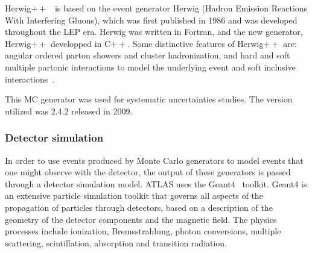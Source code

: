 {\sc Herwig}$++$~\cite{HerwigPP} is based on the event generator {\sc Herwig} (Hadron Emission Reactions With Interfering Gluons), which was first published in 1986 and was developed throughout the LEP era.  {\sc Herwig} was written in Fortran, and the new generator, Herwig$++$ developped in C$++$. 
Some distinctive features of Herwig$++$ are: angular ordered parton showers and cluster hadronization, and 
hard and soft multiple partonic interactions to model the underlying event and soft inclusive interactions~\cite{1126-6708-2008-07-076}.

This MC generator was used for systematic uncertainties studies. The version utilized was 2.4.2 released in 2009. 


\subsubsection{Detector simulation}

In order to use events produced by Monte Carlo generators to model events that one might observe with the detector, the output of these generators is passed through a detector simulation model.  ATLAS uses the {\sc Geant}4~\cite{Geant4} toolkit. {\sc Geant}4  is an extensive particle simulation toolkit that governs all aspects of the propagation of particles through detectors, based on a description of the geometry of the detector components and the magnetic field. The physics processes include ionization, Bremsstrahlung, photon conversions, multiple scattering, scintillation, absorption and transition radiation.

